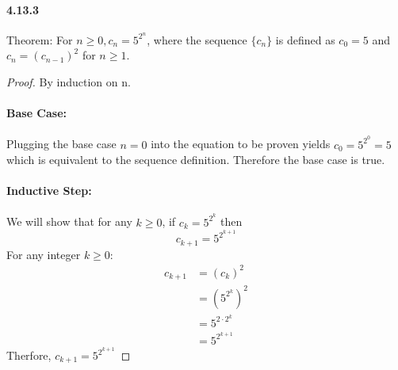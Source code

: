 \documentclass[11pt, letterpaper, twocolumn, fleqn]{article}
\begin{document}
    \paragraph{4.13.3}
        \begin{enumerate}
          \item Theorem: For $n\geq0, c_n = 5^{2^n}$, where the sequence $\{c_n\}$ is defined as $c_0=5$ and $c_n = (c_{n-1})^2$ for $n\geq1$.
            \begin{proof} By induction on n.
              \item \paragraph{Base Case:} Plugging the base case $n=0$ into the equation to be proven yields $c_0 = 5^{2^0} = 5$ which is equivalent to the sequence definition. Therefore the base case is true.

              \item \paragraph{Inductive Step:} We will show that for any $k\geq0$, if $c_k = 5^{2^k}$ then 
                $$c_{k+1} = 5^{2^{k+1}}$$
              For any integer $k\geq0$:
              \begin{align*}
                c_{k+1} &= (c_{k})^2  \tag{sequence definition} \\
                &= (5^{2^k})^2        \tag{inductive hypothesis} \\
                &= 5^{2\cdot2^k} \\
                &= 5^{2^{k+1}}
              \end{align*}
              Therfore, $c_{k+1} = 5^{2^{k+1}}$
            \end{proof}
        \end{enumerate}
\end{document}
